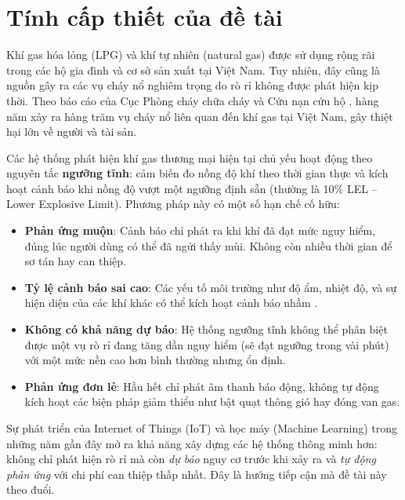 
\section{Tính cấp thiết của đề tài}

Khí gas hóa lỏng (LPG) và khí tự nhiên (natural gas) được sử dụng rộng rãi trong các hộ gia đình và cơ sở sản xuất tại Việt Nam. Tuy nhiên, đây cũng là nguồn gây ra các vụ cháy nổ nghiêm trọng do rò rỉ không được phát hiện kịp thời. Theo báo cáo của Cục Phòng cháy chữa cháy và Cứu nạn cứu hộ \cite{pccc2023}, hàng năm xảy ra hàng trăm vụ cháy nổ liên quan đến khí gas tại Việt Nam, gây thiệt hại lớn về người và tài sản.

Các hệ thống phát hiện khí gas thương mại hiện tại chủ yếu hoạt động theo nguyên tắc \textbf{ngưỡng tĩnh}: cảm biến đo nồng độ khí theo thời gian thực và kích hoạt cảnh báo khi nồng độ vượt một ngưỡng định sẵn (thường là 10\% LEL – Lower Explosive Limit). Phương pháp này có một số hạn chế cố hữu:

\begin{itemize}
  \item \textbf{Phản ứng muộn}: Cảnh báo chỉ phát ra khi khí đã đạt mức nguy hiểm, đúng lúc người dùng có thể đã ngửi thấy mùi. Không còn nhiều thời gian để sơ tán hay can thiệp.
  \item \textbf{Tỷ lệ cảnh báo sai cao}: Các yếu tố môi trường như độ ẩm, nhiệt độ, và sự hiện diện của các khí khác có thể kích hoạt cảnh báo nhầm \cite{tian2019}.
  \item \textbf{Không có khả năng dự báo}: Hệ thống ngưỡng tĩnh không thể phân biệt được một vụ rò rỉ đang tăng dần nguy hiểm (sẽ đạt ngưỡng trong vài phút) với một mức nền cao hơn bình thường nhưng ổn định.
  \item \textbf{Phản ứng đơn lẻ}: Hầu hết chỉ phát âm thanh báo động, không tự động kích hoạt các biện pháp giảm thiểu như bật quạt thông gió hay đóng van gas.
\end{itemize}

Sự phát triển của Internet of Things (IoT) và học máy (Machine Learning) trong những năm gần đây mở ra khả năng xây dựng các hệ thống thông minh hơn: không chỉ phát hiện rò rỉ mà còn \textit{dự báo} nguy cơ trước khi xảy ra và \textit{tự động phản ứng} với chi phí can thiệp thấp nhất. Đây là hướng tiếp cận mà đề tài này theo đuổi.

